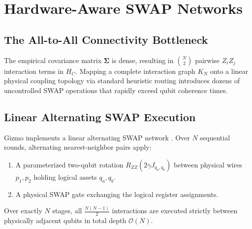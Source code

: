 \documentclass[10pt,twocolumn]{article}
\begin{document}
\begin{table}[t]
\centering
\caption{Performance Comparison: Combinatorial Benchmark ($N=8, K=3$, S\&P 500 Equities, 4,096 Total Shots)}
\label{tab:results}
\vspace{2pt}
\end{table}

\section{Hardware-Aware SWAP Networks}

\subsection{The All-to-All Connectivity Bottleneck}
The empirical covariance matrix $\boldsymbol{\Sigma}$ is dense, resulting in $\binom{N}{2}$ pairwise $Z_i Z_j$ interaction terms in $H_C$. Mapping a complete interaction graph $K_N$ onto a linear physical coupling topology via standard heuristic routing introduces dozens of uncontrolled SWAP operations that rapidly exceed qubit coherence times.

\subsection{Linear Alternating SWAP Execution}
Gizmo implements a linear alternating SWAP network \cite{kivlichan2018}. Over $N$ sequential rounds, alternating nearest-neighbor pairs apply:
\begin{enumerate}
    \item A parameterized two-qubit rotation $R_{ZZ}(2 \gamma J_{q_a, q_b})$ between physical wires $p_1, p_2$ holding logical assets $q_a, q_b$.
    \item A physical SWAP gate exchanging the logical register assignments.
\end{enumerate}
Over exactly $N$ stages, all $\frac{N(N-1)}{2}$ interactions are executed strictly between physically adjacent qubits in total depth $\mathcal{O}(N)$.
\end{document}
